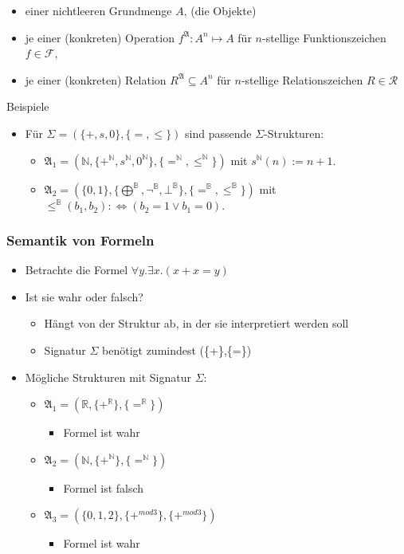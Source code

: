 \documentclass{scrartcl}
\begin{document}
\begin{itemize}
	\item einer nichtleeren Grundmenge $A$, (die Objekte)
	\item je einer (konkreten) Operation $f^{\mathfrak{A}}:A^n \mapsto A$ für $n$-stellige Funktionszeichen $f \in \mathcal{F}$,
	\item je einer (konkreten) Relation $R^{\mathfrak{A}} \subseteq A^n$ für $n$-stellige Relationszeichen $R \in \mathcal{R}$
\end{itemize}

Beispiele
\begin{itemize}
	\item Für $\Sigma = (\{ +,s,0 \}, \{ =,\leq \})$ sind passende $\Sigma$-Strukturen:
	\begin{itemize}
		\item $\mathfrak{A}_1 = (\mathbb{N}, \{ +^\mathbb{N},s^\mathbb{N},0^\mathbb{N} \}, \{ =^\mathbb{N}, \leq^\mathbb{N} \})$ mit $s^\mathbb{N}(n) := n + 1.$
		\item $\mathfrak{A}_2 = (\{ 0,1 \}, \{ \bigoplus^\mathbb{B}, \neg^\mathbb{B}, \bot^\mathbb{B} \}, \{ =^\mathbb{B}, \leq^\mathbb{B} \})$ mit $\leq^\mathbb{B} (b_1,b_2): \iff (b_2 = 1 \vee b_1 = 0).$
	\end{itemize}
\end{itemize}

\subsubsection{Semantik von Formeln}

\begin{itemize}
	\item Betrachte die Formel $\forall y.\exists x.(x + x = y)$
	\item Ist sie wahr oder falsch?
	\begin{itemize}
		\item Hängt von der Struktur ab, in der sie interpretiert werden soll
		\item Signatur $\Sigma$ benötigt zumindest (\{+\},\{=\})
	\end{itemize}
	\item Mögliche Strukturen mit Signatur $\Sigma$:
	\begin{itemize}
		\item $\mathfrak{A}_1 = (\mathbb{R}, \{ +^\mathbb{R} \}, \{ =^\mathbb{R} \})$
		\begin{itemize}
			\item Formel ist wahr
		\end{itemize}
		\item $\mathfrak{A}_2 = (\mathbb{N}, \{ +^\mathbb{N} \}, \{ =^\mathbb{N} \})$
		\begin{itemize}
			\item Formel ist falsch
		\end{itemize}
		\item $\mathfrak{A}_3 = (\{ 0,1,2 \}, \{ +^{mod 3} \}, \{ +^{mod 3} \})$
		\begin{itemize}
			\item Formel ist wahr
		\end{itemize}
	\end{itemize}
\end{itemize}
\end{document}
